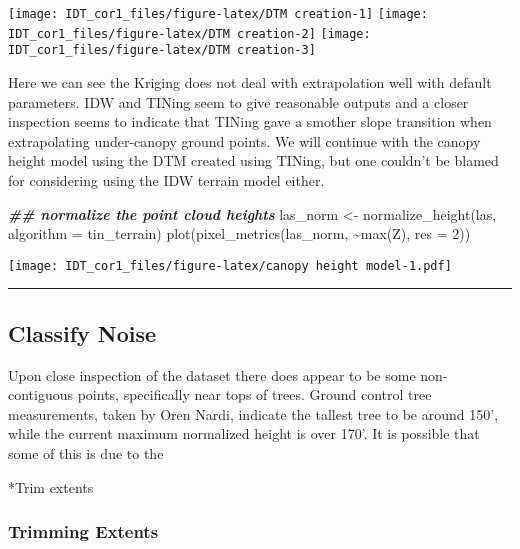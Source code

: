 \documentclass[
]{article}
\newenvironment{Shaded}{\begin{snugshade}}{\end{snugshade}}
\newcommand{\AttributeTok}[1]{\textcolor[rgb]{0.77,0.63,0.00}{#1}}
\newcommand{\DecValTok}[1]{\textcolor[rgb]{0.00,0.00,0.81}{#1}}
\newcommand{\DocumentationTok}[1]{\textcolor[rgb]{0.56,0.35,0.01}{\textbf{\textit{#1}}}}
\newcommand{\FunctionTok}[1]{\textcolor[rgb]{0.00,0.00,0.00}{#1}}
\newcommand{\NormalTok}[1]{#1}
\newcommand{\OtherTok}[1]{\textcolor[rgb]{0.56,0.35,0.01}{#1}}
\newcommand{\SpecialCharTok}[1]{\textcolor[rgb]{0.00,0.00,0.00}{#1}}
\begin{document}
\texttt{[image: IDT\_cor1\_files/figure-latex/DTM creation-1]}
\texttt{[image: IDT\_cor1\_files/figure-latex/DTM creation-2]}
\texttt{[image: IDT\_cor1\_files/figure-latex/DTM creation-3]}

Here we can see the Kriging does not deal with extrapolation well with
default parameters. IDW and TINing seem to give reasonable outputs and a
closer inspection seems to indicate that TINing gave a smother slope
transition when extrapolating under-canopy ground points. We will
continue with the canopy height model using the DTM created using
TINing, but one couldn't be blamed for considering using the IDW terrain
model either.

\begin{Shaded}
\begin{Highlighting}[]
\DocumentationTok{\#\# normalize the point cloud heights}
\NormalTok{las\_norm }\OtherTok{\textless{}{-}} \FunctionTok{normalize\_height}\NormalTok{(las, }\AttributeTok{algorithm =}\NormalTok{ tin\_terrain)}
\FunctionTok{plot}\NormalTok{(}\FunctionTok{pixel\_metrics}\NormalTok{(las\_norm, }\SpecialCharTok{\textasciitilde{}}\FunctionTok{max}\NormalTok{(Z), }\AttributeTok{res =} \DecValTok{2}\NormalTok{))}
\end{Highlighting}
\end{Shaded}

\texttt{[image: IDT\_cor1\_files/figure-latex/canopy height model-1.pdf]}

\begin{center}\rule{0.5\linewidth}{0.5pt}\end{center}

\hypertarget{classify-noise}{%
\subsection{Classify Noise}\label{classify-noise}}

Upon close inspection of the dataset there does appear to be some
non-contiguous points, specifically near tops of trees. Ground control
tree measurements, taken by Oren Nardi, indicate the tallest tree to be
around 150', while the current maximum normalized height is over 170'.
It is possible that some of this is due to the

*Trim extents

\hypertarget{trimming-extents}{%
\subsubsection{Trimming Extents}\label{trimming-extents}}
\end{document}
